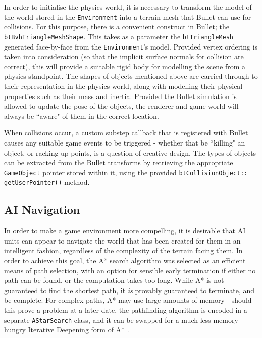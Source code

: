 \documentclass[a4paper,10pt]{article}
\begin{document}
In order to initialise the physics world, it is necessary to transform the model of the world stored in the \texttt{Environment} into a terrain mesh that Bullet can use for collisions. For this purpose, there is a convenient construct in Bullet; the \texttt{btBvhTriangleMeshShape}. This takes as a parameter the \texttt{btTriangleMesh} generated face-by-face from the \texttt{Environment}'s model. Provided vertex ordering is taken into consideration (so that the implicit surface normals for collision are correct), this will provide a suitable rigid body for modelling the scene from a physics standpoint. The shapes of objects mentioned above are carried through to their representation in the physics world, along with modelling their physical properties such as their mass and inertia. Provided the Bullet simulation is allowed to update the pose of the objects, the renderer and game world will always be ``aware" of them in the correct location.

When collisions occur, a custom substep callback that is registered with Bullet causes any suitable game events to be triggered - whether that be ``killing" an object, or racking up points, is a question of creative design. The types of objects can be extracted from the Bullet transforms by retrieving the appropriate \texttt{GameObject} pointer stored within it, using the provided \texttt{btCollisionObject:: getUserPointer()} method.

\subsection{AI Navigation}
In order to make a game environment more compelling, it is desirable that AI units can appear to navigate the world that has been created for them in an intelligent fashion, regardless of the complexity of the terrain facing them. In order to achieve this goal, the A* search algorithm \cite{astar} was selected as an efficient means of path selection, with an option for sensible early termination if either no path can be found, or the computation takes too long. While A* is not guaranteed to find the shortest path, it \textit{is} provably guaranteed to terminate, and be complete. For complex paths, A* may use large amounts of memory - should this prove a problem at a later date, the pathfinding algorithm is encoded in a separate \texttt{AStarSearch} class, and it can be swapped for a much less memory-hungry Iterative Deepening form of A* \cite{idastar}.
\end{document}
